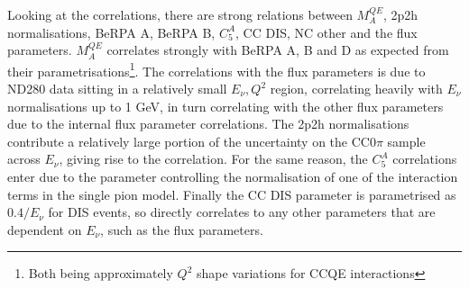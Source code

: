 Looking at the correlations, there are strong relations between $M_A^{QE}$, 2p2h normalisations, BeRPA A, BeRPA B, $C_5^A$, CC DIS, NC other and the flux parameters. $M_A^{QE}$ correlates strongly with BeRPA A, B and D as expected from their parametrisations\footnote{Both being approximately $Q^2$ shape variations for CCQE interactions}. The correlations with the flux parameters is due to ND280 data sitting in a relatively small $E_\nu, Q^2$ region, correlating heavily with $E_\nu$ normalisations up to 1 GeV, in turn correlating with the other flux parameters due to the internal flux parameter correlations. The 2p2h normalisations contribute a relatively large portion of the uncertainty on the CC0$\pi$ sample across $E_\nu$, giving rise to the correlation. For the same reason, the $C_5^A$ correlations enter due to the parameter controlling the normalisation of one of the interaction terms in the single pion model. Finally the CC DIS parameter is parametrised as $0.4/E_\nu$ for DIS events, so directly correlates to any other parameters that are dependent on $E_\nu$, such as the flux parameters.
